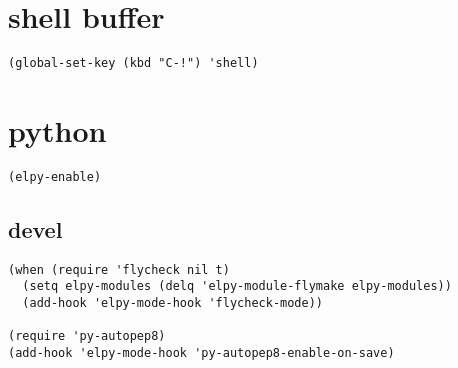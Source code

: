 \documentclass[11pt]{article}
\begin{document}
\section{shell buffer}
\label{sec:org5fc0608}
\begin{verbatim}
(global-set-key (kbd "C-!") 'shell)
\end{verbatim}
\section{python}
\label{sec:org795f96d}
\begin{verbatim}
(elpy-enable)
\end{verbatim}
\subsection{devel}
\label{sec:orgd75d8a7}
\begin{verbatim}
(when (require 'flycheck nil t)
  (setq elpy-modules (delq 'elpy-module-flymake elpy-modules))
  (add-hook 'elpy-mode-hook 'flycheck-mode))

(require 'py-autopep8)
(add-hook 'elpy-mode-hook 'py-autopep8-enable-on-save)

\end{verbatim}
\end{document}
